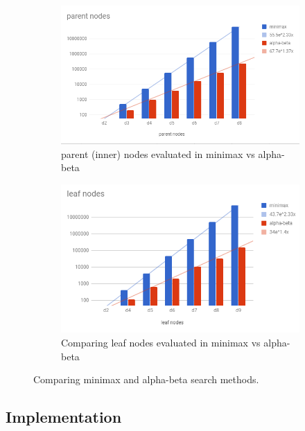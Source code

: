 \documentclass{article}
\begin{document}
\begin{figure}[ht!]
    \centering
    \begin{subfigure}[b]{0.4\linewidth}
        \includegraphics[width=\linewidth]{images/parent-nodes-abvmm.png}
        \caption{parent (inner) nodes evaluated in minimax vs alpha-beta}
    \end{subfigure}
    \begin{subfigure}[b]{0.4\linewidth}
        \includegraphics[width=\linewidth]{images/leaf-nodes-abvmm.png}
        \caption{Comparing leaf nodes evaluated in minimax vs alpha-beta}
    \end{subfigure}

    \caption{Comparing minimax and alpha-beta search methods.}
    \label{fig:ab-v-mm}
\end{figure}

\subsection{Implementation}
\end{document}
